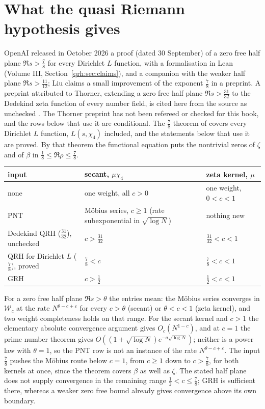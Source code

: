 \section{What the quasi Riemann hypothesis gives}\label{lv:sec:qrh}

OpenAI released in October 2026 a proof \cite{OAI26a} (dated 30 September) of a zero free half plane $\Re s>\frac78$ for every Dirichlet $L$ function, with a formalisation in Lean (Volume III, Section~\ref{qrh:sec:claims}), and a companion \cite{OAI26b} with the weaker half plane $\Re s>\frac{11}{12}$; Liu \cite{Liu26a} claims a small improvement of the exponent $\frac78$ in a preprint. A preprint attributed to Thorner, extending a zero free half plane $\Re s>\frac{31}{32}$ to the Dedekind zeta function of every number field, is cited here from the source as unchecked \cite{Thorner26}. The Thorner preprint has not been refereed or checked for this book, and the rows below that use it are conditional. The $\frac78$ theorem of \cite{OAI26a} covers every Dirichlet $L$ function, $L(s,\chi_4)$ included, and the statements below that use it are proved. By that theorem the functional equation puts the nontrivial zeros of $\zeta$ and of $\beta$ in $\frac18\le\Re\rho\le\frac78$.

\begin{center}\footnotesize
\begin{tabular}{p{}p{}p{}}
\toprule
input & secant, $\mu\chi_4$ & zeta kernel, $\mu$\\
\midrule
none & one weight, all $c>0$ & one weight, $0<c<1$\\
PNT & M\"obius series, $c\ge1$ (rate subexponential in $\sqrt{\log N}$) & nothing new\\
Dedekind QRH ($\frac{31}{32}$), unchecked & $c>\frac{31}{32}$ & $\frac{31}{32}<c<1$\\
QRH for Dirichlet $L$ ($\frac78$), proved \cite{OAI26a} & $\frac78<c$ & $\frac78<c<1$\\
GRH & $c>\frac12$ & $\frac12<c<1$\\
\bottomrule
\end{tabular}
\end{center}

\noindent For a zero free half plane $\Re s>\theta$ the entries mean: the M\"obius series converges in $\mathcal W_c$ at the rate $N^{\theta-c+\varepsilon}$ for every $c>\theta$ (secant) or $\theta<c<1$ (zeta kernel), and two weight completeness holds on that range. For the secant kernel and $c>1$ the elementary absolute convergence argument gives $O_c(N^{1-c})$, and at $c=1$ the prime number theorem gives $O((1+\sqrt{\log N})e^{-a\sqrt{\log N}})$; neither is a power law with $\theta=1$, so the PNT row is not an instance of the rate $N^{\theta-c+\varepsilon}$. The input $\frac78$ pushes the M\"obius route below $c=1$, from $c\ge1$ down to $c>\frac78$, for both kernels at once, since the theorem covers $\beta$ as well as $\zeta$. The stated half plane does not supply convergence in the remaining range $\frac12<c\le\frac78$; GRH is sufficient there, whereas a weaker zero free bound already gives convergence above its own boundary.


